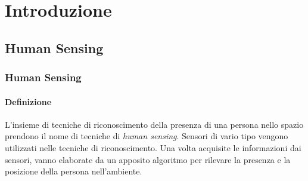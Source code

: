 
\chapter{Introduzione}
\label{chap:introduction}
    \section{Human Sensing}
    \label{sec:human_sensing}
        \subsection{Human Sensing}
            \subsubsection{Definizione}
                L'insieme di tecniche di riconoscimento della presenza di una persona nello spazio prendono il nome di tecniche di \emph{human sensing}.
                Sensori di vario tipo vengono utilizzati nelle tecniche di riconoscimento.
                Una volta acquisite le informazioni dai sensori, vanno elaborate da un apposito algoritmo per rilevare la presenza e la posizione della persona nell'ambiente.
